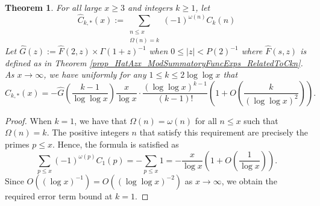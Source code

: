 \documentclass[11pt,reqno,a4letter]{article}
\numberwithin{figure}{section}
\numberwithin{table}{section}
\theoremstyle{plain}
\newtheorem{theorem}{Theorem}
\numberwithin{theorem}{section}
\theoremstyle{definition}
\begin{document}
\begin{theorem} 
\label{theorem_CnkSpCasesScaledSummatoryFuncs} 
For all large $x \geq 3$ and integers $k \geq 1$, let 
\[
\widehat{C}_{k,\ast}(x) := \sum_{\substack{n \leq x \\ \Omega(n) = k}} 
     (-1)^{\omega(n)} C_k(n) 
\]
Let $\widehat{G}(z) := \widehat{F}(2, z) \times \Gamma(1+z)^{-1}$ when 
$0 \leq |z| < P(2)^{-1}$ where $\widehat{F}(s, z)$ is defined as 
in Theorem \ref{prop_HatAzx_ModSummatoryFuncExps_RelatedToCkn}. 
As $x \rightarrow \infty$, we have uniformly for any $1 \leq k \leq 2\log\log x$ that 
\[
\widehat{C}_{k,\ast}(x) = -\widehat{G}\left(\frac{k-1}{\log\log x}\right) \frac{x}{\log x} \cdot 
     \frac{(\log\log x)^{k-1}}{(k-1)!} \left( 
     1 + O\left(\frac{k}{(\log\log x)^2}\right)\right). 
\]
\end{theorem} 
\begin{proof} 
When $k = 1$, we have that $\Omega(n) = \omega(n)$ for all $n \leq x$ such that $\Omega(n) = k$. 
The positive integers $n$ that satisfy this requirement are precisely the primes $p \leq x$. 
Hence, the formula is satisfied as 
\[
\sum_{p \leq x} (-1)^{\omega(p)} C_1(p) = -\sum_{p \leq x} 1 = 
     - \frac{x}{\log x} \left(1 + O\left(\frac{1}{\log x}\right)\right). 
\]
Since $O\left((\log x)^{-1}\right) = O\left((\log\log x)^{-2}\right)$ as 
$x \rightarrow \infty$, we obtain the required error term bound at $k = 1$. 


\end{proof}
\end{document}
